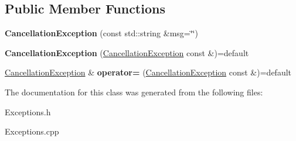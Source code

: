 \subsection*{Public Member Functions}
\begin{DoxyCompactItemize}
\item 
\mbox{\label{classantlr4_1_1CancellationException_ad8d9c4154d9f3f68fcb5ac40516ee574}} 
{\bfseries Cancellation\+Exception} (const std\+::string \&msg=\char`\"{}\char`\"{})
\item 
\mbox{\label{classantlr4_1_1CancellationException_aca7427f541200bf2a5555254e24f2ede}} 
{\bfseries Cancellation\+Exception} (\hyperlink{classantlr4_1_1CancellationException}{Cancellation\+Exception} const \&)=default
\item 
\mbox{\label{classantlr4_1_1CancellationException_a7f2671b44cc18b718e37b23ed9c8640b}} 
\hyperlink{classantlr4_1_1CancellationException}{Cancellation\+Exception} \& {\bfseries operator=} (\hyperlink{classantlr4_1_1CancellationException}{Cancellation\+Exception} const \&)=default
\end{DoxyCompactItemize}


The documentation for this class was generated from the following files\+:\begin{DoxyCompactItemize}
\item 
Exceptions.\+h\item 
Exceptions.\+cpp\end{DoxyCompactItemize}
